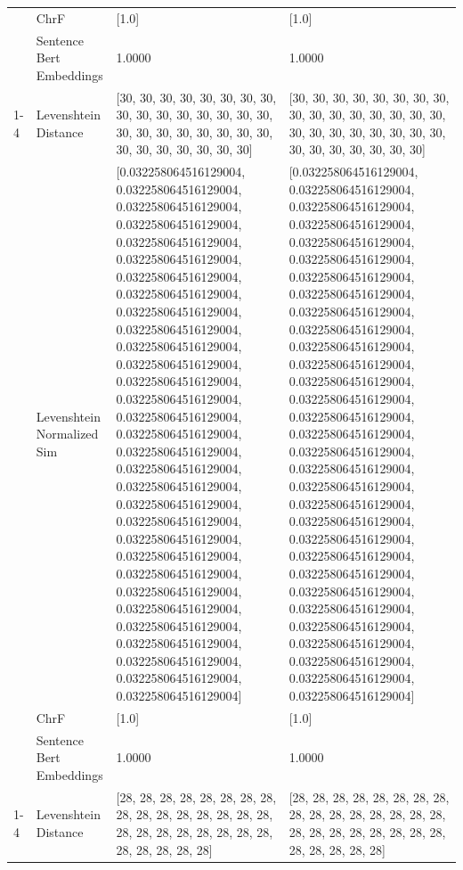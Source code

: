 \begin{tabular}{llll}
 & ChrF & [1.0] & [1.0] \\
 & Sentence Bert Embeddings & 1.0000 & 1.0000 \\
\cline{1-4}
\multirow[t]{4}{*}{Omokungu omuya nigo are omotiri omuya.} & Levenshtein Distance & [30, 30, 30, 30, 30, 30, 30, 30, 30, 30, 30, 30, 30, 30, 30, 30, 30, 30, 30, 30, 30, 30, 30, 30, 30, 30, 30, 30, 30, 30, 30] & [30, 30, 30, 30, 30, 30, 30, 30, 30, 30, 30, 30, 30, 30, 30, 30, 30, 30, 30, 30, 30, 30, 30, 30, 30, 30, 30, 30, 30, 30, 30] \\
 & Levenshtein Normalized Sim & [0.032258064516129004, 0.032258064516129004, 0.032258064516129004, 0.032258064516129004, 0.032258064516129004, 0.032258064516129004, 0.032258064516129004, 0.032258064516129004, 0.032258064516129004, 0.032258064516129004, 0.032258064516129004, 0.032258064516129004, 0.032258064516129004, 0.032258064516129004, 0.032258064516129004, 0.032258064516129004, 0.032258064516129004, 0.032258064516129004, 0.032258064516129004, 0.032258064516129004, 0.032258064516129004, 0.032258064516129004, 0.032258064516129004, 0.032258064516129004, 0.032258064516129004, 0.032258064516129004, 0.032258064516129004, 0.032258064516129004, 0.032258064516129004, 0.032258064516129004, 0.032258064516129004] & [0.032258064516129004, 0.032258064516129004, 0.032258064516129004, 0.032258064516129004, 0.032258064516129004, 0.032258064516129004, 0.032258064516129004, 0.032258064516129004, 0.032258064516129004, 0.032258064516129004, 0.032258064516129004, 0.032258064516129004, 0.032258064516129004, 0.032258064516129004, 0.032258064516129004, 0.032258064516129004, 0.032258064516129004, 0.032258064516129004, 0.032258064516129004, 0.032258064516129004, 0.032258064516129004, 0.032258064516129004, 0.032258064516129004, 0.032258064516129004, 0.032258064516129004, 0.032258064516129004, 0.032258064516129004, 0.032258064516129004, 0.032258064516129004, 0.032258064516129004, 0.032258064516129004] \\
 & ChrF & [1.0] & [1.0] \\
 & Sentence Bert Embeddings & 1.0000 & 1.0000 \\
\cline{1-4}
\multirow[t]{4}{*}{Rituko ri'obuya tiriogendereri.} & Levenshtein Distance & [28, 28, 28, 28, 28, 28, 28, 28, 28, 28, 28, 28, 28, 28, 28, 28, 28, 28, 28, 28, 28, 28, 28, 28, 28, 28, 28, 28, 28] & [28, 28, 28, 28, 28, 28, 28, 28, 28, 28, 28, 28, 28, 28, 28, 28, 28, 28, 28, 28, 28, 28, 28, 28, 28, 28, 28, 28, 28] \\

\end{tabular}
